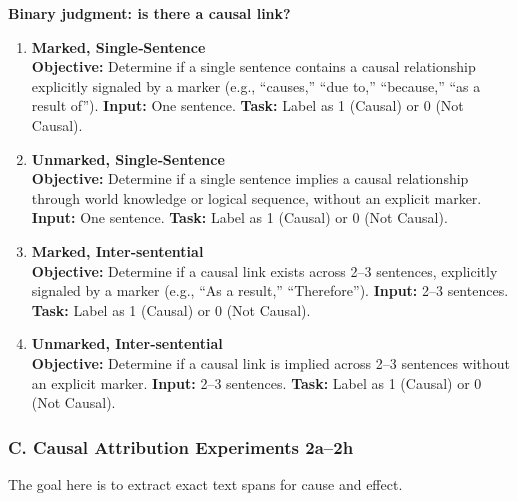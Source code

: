 \documentclass[conference]{IEEEtran}
\begin{document}
\textbf{Binary judgment: is there a causal link?}

\begin{enumerate}
  \item \textbf{Marked, Single‑Sentence}\\
    \textbf{Objective:} Determine if a single sentence contains a causal relationship explicitly signaled by a marker (e.g., “causes,” “due to,” “because,” “as a result of”).  
    \textbf{Input:} One sentence.  
    \textbf{Task:} Label as 1 (Causal) or 0 (Not Causal).
  \item \textbf{Unmarked, Single‑Sentence}\\
    \textbf{Objective:} Determine if a single sentence implies a causal relationship through world knowledge or logical sequence, without an explicit marker.  
    \textbf{Input:} One sentence.  
    \textbf{Task:} Label as 1 (Causal) or 0 (Not Causal).
  \item \textbf{Marked, Inter‑sentential}\\
    \textbf{Objective:} Determine if a causal link exists across 2–3 sentences, explicitly signaled by a marker (e.g., “As a result,” “Therefore”).  
    \textbf{Input:} 2–3 sentences.  
    \textbf{Task:} Label as 1 (Causal) or 0 (Not Causal).
  \item \textbf{Unmarked, Inter‑sentential}\\
    \textbf{Objective:} Determine if a causal link is implied across 2–3 sentences without an explicit marker.  
    \textbf{Input:} 2–3 sentences.  
    \textbf{Task:} Label as 1 (Causal) or 0 (Not Causal).
\end{enumerate}

\subsubsection*{C. Causal Attribution Experiments 2a--2h}

The goal here is to extract exact text spans for cause and effect.
\end{document}

